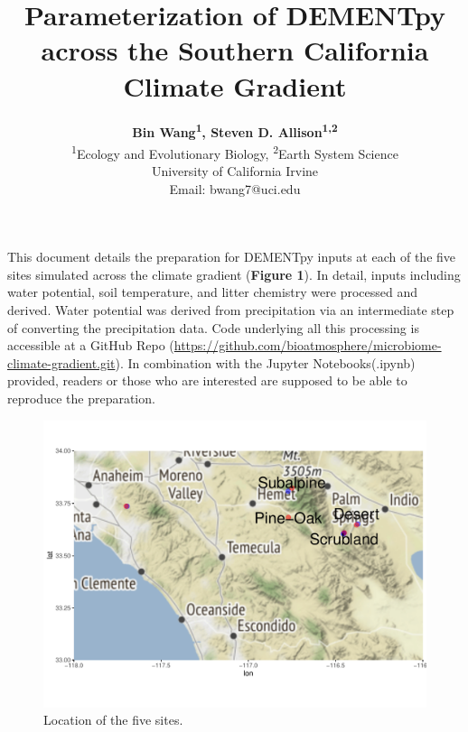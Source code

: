 \documentclass[letterpaper, 10pt]{article}
\begin{document}
\setlength{\droptitle}{-8em} 
\title{\large\textbf{Parameterization of DEMENTpy across the Southern California Climate Gradient}\vspace{-1em}}
\author{\normalsize\textbf{Bin Wang\textsuperscript{1}, Steven D. Allison\textsuperscript{1,2}}\vspace{1em} \\
\textsuperscript{1}Ecology and Evolutionary Biology, \textsuperscript{2}Earth System Science \\
University of California Irvine\vspace{0em} \\
Email: bwang7@uci.edu} 
\maketitle


This document details the preparation for DEMENTpy inputs at each of the five sites simulated across the climate gradient (\textbf{Figure 1}). In detail, inputs including water potential, soil temperature, and litter chemistry were processed and derived. Water potential was derived from precipitation via an intermediate step of converting the precipitation data. Code underlying all this processing is accessible at a GitHub Repo (\url{https://github.com/bioatmosphere/microbiome-climate-gradient.git}). In combination with the Jupyter Notebooks(.ipynb) provided, readers or those who are interested are supposed to be able to reproduce the preparation.

\begin{figure}[h]
\centering
      \includegraphics[scale=0.5]{site_location_v1.pdf}
      \caption{Location of the five sites.}
      \label{fig: figure 1}
\end{figure}
\end{document}
